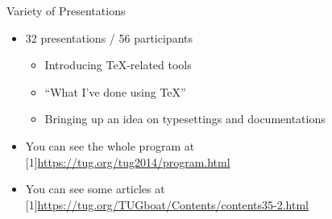 \documentclass[17pt,dvipdfmx]{beamer}
\begin{document}
\begin{frame}[t]{Variety of Presentations}
  \bfseries\rmfamily
  \begin{itemize}
    \item 32 presentations / 56 participants \\
    \begin{itemize}
      \item Introducing \TeX-related tools
      \item ``What I've done using \TeX''
      \item Bringing up an idea on typesettings and documentations
    \end{itemize}
  \item You can see the whole program at\\[-5pt] 
  \hspace*{-2pt}\scalebox{0.9}[1]{\small{\url{https://tug.org/tug2014/program.html}}}
  \item You can see some articles at\\[-5pt] 
  \hspace*{-2pt}\scalebox{0.7}[1]{\small{\url{https://tug.org/TUGboat/Contents/contents35-2.html}}}
  \end{itemize}
  \vfill
\end{frame}
\end{document}
